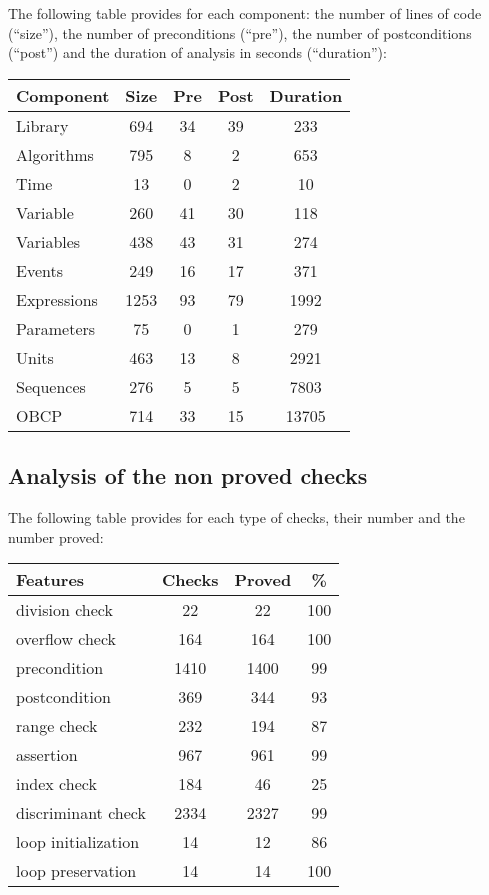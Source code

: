 \documentclass[10pt,a4paper,twocolumn]{article}
\begin{document}
The following table provides for each component: the number of lines of code (``size''), the number of preconditions (``pre''), the number of postconditions (``post'') and the duration of analysis in seconds (``duration''):

\vspace{5mm}

\begin{tabular}{|l|c|c|c|c|}
\hline
Component   & Size & Pre & Post & Duration \\
\hline
Library     &  694 &  34 &   39 &   233 \\
\hline
Algorithms  &  795 &   8 &    2 &   653 \\
\hline
Time        &   13 &   0 &    2 &    10 \\
\hline
Variable    &  260 &  41 &   30 &   118 \\
\hline
Variables   &  438 &  43 &   31 &   274 \\
\hline
Events      &  249 &  16 &   17 &   371 \\
\hline
Expressions & 1253 &  93 &   79 &  1992 \\
\hline
Parameters  &   75 &   0 &    1 &   279 \\
\hline
Units       &  463 &  13 &    8 &  2921 \\
\hline
Sequences   &  276 &   5 &    5 &  7803 \\
\hline
OBCP        &  714 &  33 &   15 & 13705 \\
\hline
\end{tabular}

\subsection{Analysis of the non proved checks}

The following table provides for each type of checks, their number and the number proved:

\vspace{5mm}

\begin{tabular}{|l|c|c|c|}
\hline
Features            & Checks & Proved & \%  \\
\hline
division check      & 22     & 22     & 100 \\
\hline
overflow check      & 164    & 164    & 100 \\
\hline
precondition        & 1410   & 1400   & 99  \\
\hline
postcondition       & 369    & 344    & 93  \\
\hline
range check         & 232    & 194    & 87  \\
\hline
assertion           & 967    & 961    & 99  \\
\hline
index check         & 184    & 46     & 25  \\
\hline
discriminant check  & 2334   & 2327   & 99  \\
\hline
loop initialization & 14     & 12     & 86  \\
\hline
loop  preservation  & 14     & 14     & 100 \\
\hline
\end{tabular}
\end{document}
